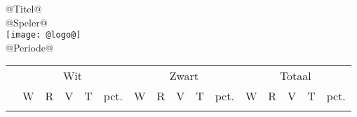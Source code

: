 \documentclass[a4paper]{scrreprt}
\begin{document}
  \begin{titlepage}
    \begin{center}
      \huge \color{headingkleur}@Titel@ \\
      \vspace{1in}
      \large \color{headingkleur}@Speler@ \\
      \vspace{2in}
      \texttt{[image: @logo@]} \\
      \vspace{1in}
      \large \color{headingkleur}@Periode@ \\
    \end{center}
  \end{titlepage}
  \footnotesize
  \begin{center}
    \begin{longtable} { | l | r | r | r | r | r | r | r | r | r | r | r | r | r | r | r | }
      \hline
      \rowcolor{headingkleur}
 & \multicolumn{5}{c|}{ \color{headingtekstkleur}Wit } & \multicolumn{5}{c|}{ \color{headingtekstkleur}Zwart } & \multicolumn{5}{c|}{ \color{headingtekstkleur}Totaal } \\
      \cline{2-16}
      \rowcolor{headingkleur}
 & \color{headingtekstkleur}W & \color{headingtekstkleur}R & \color{headingtekstkleur}V & \color{headingtekstkleur}T & \color{headingtekstkleur}pct. & \color{headingtekstkleur}W & \color{headingtekstkleur}R & \color{headingtekstkleur}V & \color{headingtekstkleur}T & \color{headingtekstkleur}pct. & \color{headingtekstkleur}W & \color{headingtekstkleur}R & \color{headingtekstkleur}V & \color{headingtekstkleur}T & \color{headingtekstkleur}pct. \\
      \hline
      \endhead
      \arrayrulecolor{headingkleur}
    \end{longtable}
  \end{center}
\end{document}
